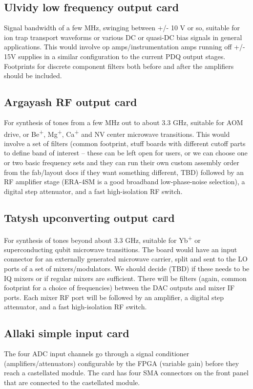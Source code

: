 \documentclass[11pt]{paper}
\begin{document}
\subsection{Ulvidy low frequency output card}
Signal bandwidth of a few MHz, swinging between +/- 10 V or so, suitable for ion trap transport waveforms or various DC or quasi-DC bias signals in general applications. This would involve op amps/instrumentation amps running off +/- 15V supplies in a similar configuration to the current PDQ output stages. Footprints for discrete component filters both before and after the amplifiers should be included.

\subsection{Argayash RF output card}
For synthesis of tones from a few MHz out to about 3.3 GHz, suitable for AOM drive, or Be\textsuperscript{+}, Mg\textsuperscript{+}, Ca\textsuperscript{+} and NV center microwave transitions. This would involve a set of filters (common footprint, stuff boards with different cutoff parts to define band of interest -- these can be left open for users, or we can choose one or two basic frequency sets and they can run their own custom assembly order from the fab/layout docs if they want something different, TBD) followed by an RF amplifier stage (ERA-4SM is a good broadband low-phase-noise selection), a digital step attenuator, and a fast high-isolation RF switch.

\subsection{Tatysh upconverting output card}
For synthesis of tones beyond about 3.3 GHz, suitable for Yb\textsuperscript{+} or superconducting qubit microwave transitions. The board would have an input connector for an externally generated microwave carrier, split and sent to the LO ports of a set of mixers/modulators. We should decide (TBD) if these needs to be IQ mixers or if regular mixers are sufficient. There will be filters (again, common footprint for a choice of frequencies) between the DAC outputs and mixer IF ports. Each mixer RF port will be followed by an amplifier, a digital step attenuator, and a fast high-isolation RF switch.

\subsection{Allaki simple input card}
The four ADC input channels go through a signal conditioner (amplifiers/attenuators) configurable by the FPGA (variable gain) before they reach a castellated module. The card has four SMA connectors on the front panel that are connected to the castellated module.
\end{document}
